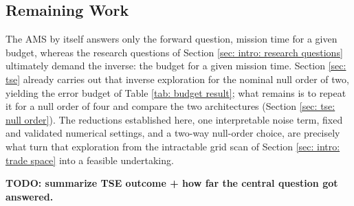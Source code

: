 \documentclass[12pt,a4paper]{article}
\numberwithin{equation}{section}
\numberwithin{figure}{section}
\numberwithin{table}{section}
\begin{document}
\subsection{Remaining Work}
The AMS by itself answers only the forward question, mission time for a given budget, whereas the research questions of Section \ref{sec: intro: research questions} ultimately demand the inverse: the budget for a given mission time. Section \ref{sec: tse} already carries out that inverse exploration for the nominal null order of two, yielding the error budget of Table \ref{tab: budget result}; what remains is to repeat it for a null order of four and compare the two architectures (Section \ref{sec: tse: null order}). The reductions established here, one interpretable noise term, fixed and validated numerical settings, and a two-way null-order choice, are precisely what turn that exploration from the intractable grid scan of Section \ref{sec: intro: trade space} into a feasible undertaking.

\textbf{TODO: summarize TSE outcome + how far the central question got answered.}

\appendix
\end{document}
